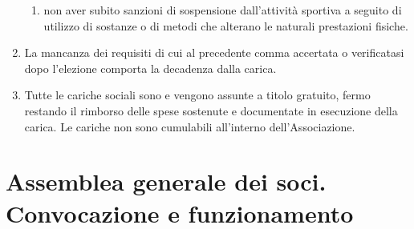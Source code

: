 \documentclass{djtsdoc}
\begin{document}
\begin{enumerate}
\begin{enumerate}
			\item non aver subito sanzioni di sospensione dall'attività sportiva a seguito di utilizzo di sostanze o di metodi che alterano le naturali prestazioni fisiche.
		\end{enumerate}
		\item La mancanza dei requisiti di cui al precedente comma accertata o verificatasi dopo l'elezione comporta la decadenza dalla carica.
		\item Tutte le cariche sociali sono e vengono assunte a titolo gratuito, fermo restando il rimborso delle  spese sostenute e documentate in esecuzione della carica. Le cariche non sono cumulabili all'interno dell'Associazione.
	\end{enumerate}
	
	\section{Assemblea generale dei soci. Convocazione e funzionamento}
\end{document}
